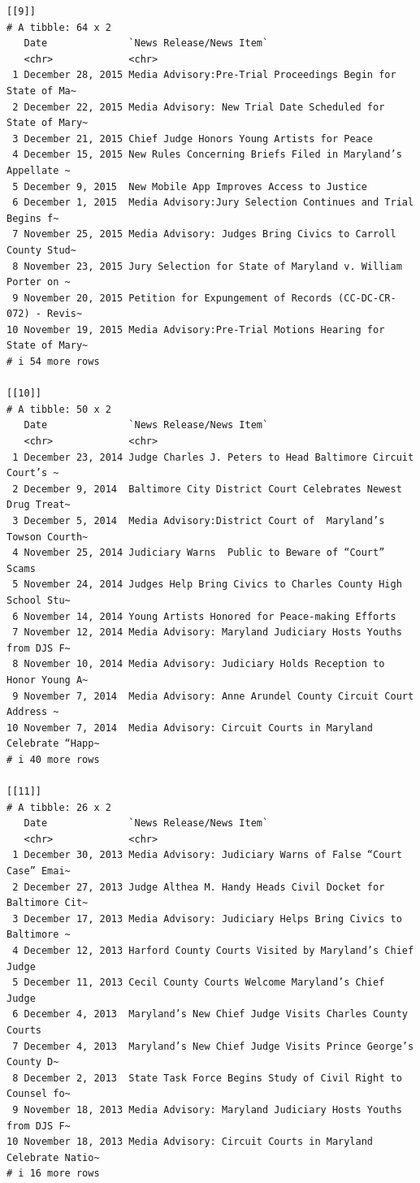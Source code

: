 \documentclass[
  letterpaper,
  DIV=11,
  numbers=noendperiod]{scrreprt}
\begin{document}
\begin{verbatim}
[[9]]
# A tibble: 64 x 2
   Date              `News Release/News Item`                                   
   <chr>             <chr>                                                      
 1 December 28, 2015 Media Advisory:Pre-Trial Proceedings Begin for State of Ma~
 2 December 22, 2015 Media Advisory: New Trial Date Scheduled for State of Mary~
 3 December 21, 2015 Chief Judge Honors Young Artists for Peace                 
 4 December 15, 2015 New Rules Concerning Briefs Filed in Maryland’s Appellate ~
 5 December 9, 2015  New Mobile App Improves Access to Justice                  
 6 December 1, 2015  Media Advisory:Jury Selection Continues and Trial Begins f~
 7 November 25, 2015 Media Advisory: Judges Bring Civics to Carroll County Stud~
 8 November 23, 2015 Jury Selection for State of Maryland v. William Porter on ~
 9 November 20, 2015 Petition for Expungement of Records (CC-DC-CR-072) - Revis~
10 November 19, 2015 Media Advisory:Pre-Trial Motions Hearing for State of Mary~
# i 54 more rows

[[10]]
# A tibble: 50 x 2
   Date              `News Release/News Item`                                   
   <chr>             <chr>                                                      
 1 December 23, 2014 Judge Charles J. Peters to Head Baltimore Circuit Court’s ~
 2 December 9, 2014  Baltimore City District Court Celebrates Newest Drug Treat~
 3 December 5, 2014  Media Advisory:District Court of  Maryland’s Towson Courth~
 4 November 25, 2014 Judiciary Warns  Public to Beware of “Court” Scams         
 5 November 24, 2014 Judges Help Bring Civics to Charles County High School Stu~
 6 November 14, 2014 Young Artists Honored for Peace-making Efforts             
 7 November 12, 2014 Media Advisory: Maryland Judiciary Hosts Youths from DJS F~
 8 November 10, 2014 Media Advisory: Judiciary Holds Reception to Honor Young A~
 9 November 7, 2014  Media Advisory: Anne Arundel County Circuit Court Address ~
10 November 7, 2014  Media Advisory: Circuit Courts in Maryland Celebrate “Happ~
# i 40 more rows

[[11]]
# A tibble: 26 x 2
   Date              `News Release/News Item`                                   
   <chr>             <chr>                                                      
 1 December 30, 2013 Media Advisory: Judiciary Warns of False “Court Case” Emai~
 2 December 27, 2013 Judge Althea M. Handy Heads Civil Docket for Baltimore Cit~
 3 December 17, 2013 Media Advisory: Judiciary Helps Bring Civics to Baltimore ~
 4 December 12, 2013 Harford County Courts Visited by Maryland’s Chief Judge    
 5 December 11, 2013 Cecil County Courts Welcome Maryland’s Chief  Judge        
 6 December 4, 2013  Maryland’s New Chief Judge Visits Charles County Courts    
 7 December 4, 2013  Maryland’s New Chief Judge Visits Prince George’s County D~
 8 December 2, 2013  State Task Force Begins Study of Civil Right to Counsel fo~
 9 November 18, 2013 Media Advisory: Maryland Judiciary Hosts Youths from DJS F~
10 November 18, 2013 Media Advisory: Circuit Courts in Maryland Celebrate Natio~
# i 16 more rows
\end{verbatim}
\end{document}
